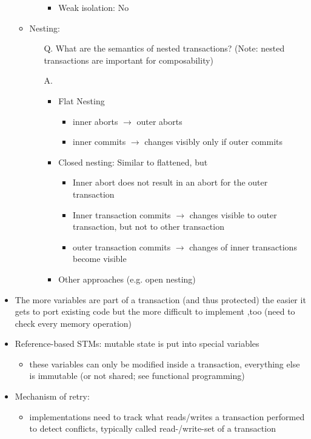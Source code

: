 \documentclass[a4paper]{article}
\begin{document}
\begin{itemize}
\begin{itemize}
\begin{enumerate}
\begin{itemize}
\item Weak isolation: No
\end{itemize}
\end{enumerate}
\item Nesting:
\begin{enumerate}
\item[Q.] What are the semantics of nested transactions? (Note: nested transactions are important for composability)
\item[A.]
\begin{itemize}
\item Flat Nesting
\begin{itemize}
\item inner aborts $\rightarrow$ outer aborts
\item inner commits $\rightarrow$ changes visibly only if outer commits
\end{itemize}
\item Closed nesting: Similar to flattened, but
\begin{itemize}
\item Inner abort does not result in an abort for the outer transaction
\item Inner transaction commits $\to$ changes visible to outer transaction, but not to other transaction
\item outer transaction commits $\to$ changes of inner transactions become visible
\end{itemize}
\item Other approaches (e.g. open nesting)
\end{itemize}
\end{enumerate}
\end{itemize}
\item The more variables are part of a transaction (and thus protected) the easier it gets to port existing code but the more difficult to implement ,too (need to check every memory operation)
\item Reference-based STMs: mutable state is put into special variables
\begin{itemize}
\item  these variables can only be modified inside a transaction, everything else is immutable (or not shared; see functional programming)
\end{itemize}
\item Mechanism of retry: 
\begin{itemize}
\item implementations need to track what reads/writes a transaction performed to detect conflicts, typically called read-/write-set of a transaction

\end{itemize}
\end{itemize}
\end{document}
